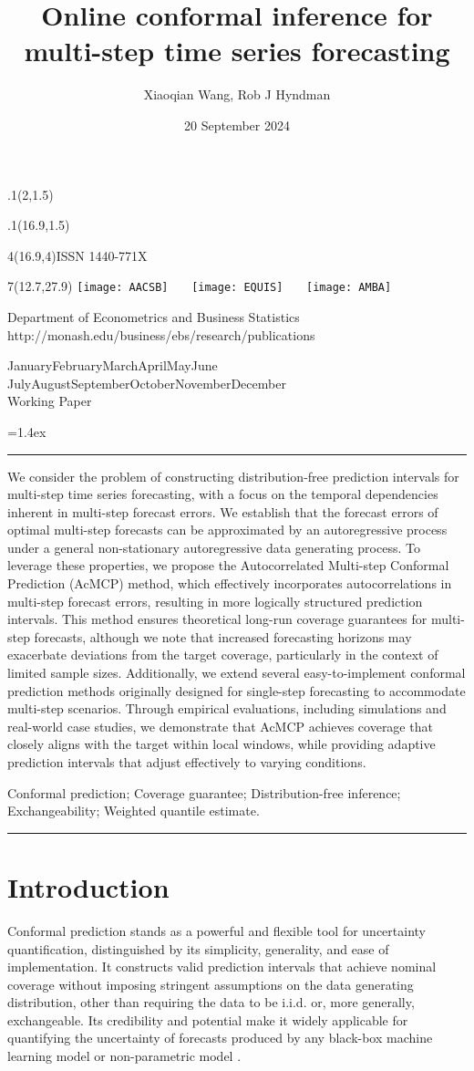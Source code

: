 \documentclass[
  11pt,
  a4paper,
]{article}
\title{Online conformal inference for multi-step time series
forecasting}
\date{20 September 2024}
\author{Xiaoqian Wang, Rob J Hyndman}
\makeatletter
\theoremstyle{plain}
\theoremstyle{remark}
\def\placefig#1#2#3#4{\begin{textblock}{.1}(#1,#2)\rlap{\texttt{[image: \#4]}}\end{textblock}}
\def\Date{\number\day}
\def\Month{\ifcase\month\or
 January\or February\or March\or April\or May\or June\or
 July\or August\or September\or October\or November\or December\fi}
\def\Year{\number\year}
\def\showjel{{\large\textsf{\textbf{JEL classification:}}~\@jel}}
\def\cover{{\sffamily\setcounter{page}{0}
        \thispagestyle{empty}
        \placefig{2}{1.5}{width=5cm}{monash2}
        \placefig{16.9}{1.5}{width=2.1cm}{MBSportrait}
        \begin{textblock}{4}(16.9,4)ISSN 1440-771X\end{textblock}
        \begin{textblock}{7}(12.7,27.9)\hfill
        \texttt{[image: AACSB]}~~~
        \texttt{[image: EQUIS]}~~~
        \texttt{[image: AMBA]}
        \end{textblock}
        \vspace*{2.5cm}
        \begin{center}\Large
        Department of Econometrics and Business Statistics\\[.5cm]
        \footnotesize http://monash.edu/business/ebs/research/publications
        \end{center}\vspace{2cm}
        \begin{center}
        \fbox{\parbox{14cm}{\begin{onehalfspace}\centering\Huge\vspace*{0.3cm}
                \textsf{\textbf{\expandafter{\@title}}}\vspace{1cm}\par
                \LARGE
                \expandafter{\@author}
                \end{onehalfspace}
        }}
        \end{center}
        \vfill
                \begin{center}\Large
                \Month~\Year\\[1cm]
                Working Paper \@wp
        \end{center}\vspace*{2cm}}}
\def\pageone{{\sffamily\setstretch{1}%
        \thispagestyle{empty}%
        \vbox to \textheight{%
        \raggedright\baselineskip=1.2cm
     {\fontsize{24.88}{30}\sffamily\textbf{\expandafter{\@title}}}
        \vspace{2cm}\par
        \hspace{1cm}\parbox{14cm}{\sffamily\large\@addresses}\vspace{1cm}\vfill
        \hspace{1cm}{\large\Date~\Month~\Year}\\[1cm]
        \hspace{1cm}\showjel\vss}}}
\def\blindtitle{{\sffamily
     \thispagestyle{plain}\raggedright\baselineskip=1.2cm
     {\fontsize{24.88}{30}\sffamily\textbf{\expandafter{\@title}}}\vspace{1cm}\par
        }}
\def\titlepage{{\cover\newpage\pageone\newpage\blindtitle}}
\let\maketitle\titlepage
\newenvironment{keywords}{\par\vspace{0.5cm}\noindent{\sffamily\textbf{Keywords:}}}{\vspace{0.25cm}\par\hrule\vspace{0.5cm}\par}
\renewenvironment{abstract}{\begin{minipage}{\textwidth}\parskip=1.4ex\noindent
\hrule\vspace{0.1cm}\par{\sffamily\textbf{\abstractname}}\newline\setstretch{1}}
  {\end{minipage}}
\makeatother
\begin{document}
\maketitle

\begin{abstract}
We consider the problem of constructing distribution-free prediction
intervals for multi-step time series forecasting, with a focus on the
temporal dependencies inherent in multi-step forecast errors. We
establish that the forecast errors of optimal multi-step forecasts can
be approximated by an autoregressive process under a general
non-stationary autoregressive data generating process. To leverage these
properties, we propose the Autocorrelated Multi-step Conformal
Prediction (AcMCP) method, which effectively incorporates
autocorrelations in multi-step forecast errors, resulting in more
logically structured prediction intervals. This method ensures
theoretical long-run coverage guarantees for multi-step forecasts,
although we note that increased forecasting horizons may exacerbate
deviations from the target coverage, particularly in the context of
limited sample sizes. Additionally, we extend several easy-to-implement
conformal prediction methods originally designed for single-step
forecasting to accommodate multi-step scenarios. Through empirical
evaluations, including simulations and real-world case studies, we
demonstrate that AcMCP achieves coverage that closely aligns with the
target within local windows, while providing adaptive prediction
intervals that adjust effectively to varying conditions.
\end{abstract}

\begin{keywords}
  Conformal prediction; Coverage guarantee; Distribution-free
inference; Exchangeability; 
  Weighted quantile estimate.
\end{keywords}


\section{Introduction}\label{sec-intro}

Conformal prediction \autocite{vovk2005} stands as a powerful and
flexible tool for uncertainty quantification, distinguished by its
simplicity, generality, and ease of implementation. It constructs valid
prediction intervals that achieve nominal coverage without imposing
stringent assumptions on the data generating distribution, other than
requiring the data to be i.i.d. or, more generally, exchangeable. Its
credibility and potential make it widely applicable for quantifying the
uncertainty of forecasts produced by any black-box machine learning
model \autocite{shafer2008,papadopoulos2008,barber2021} or
non-parametric model \autocite{lei2014}.
\end{document}
